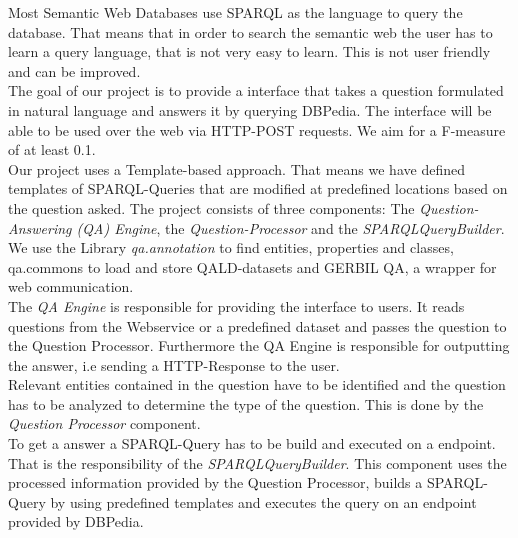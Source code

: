 \documentclass[runningheads]{llncs}
\begin{document}
Most Semantic Web Databases use SPARQL as the language to query the database. That means that in order to search the semantic web the user has to learn a query language, that is not very easy to learn. This is not user friendly and can be improved. \\

The goal of our project is to provide a interface that takes a question formulated in natural language and answers it by querying DBPedia. The interface will be able to be used over the web via HTTP-POST requests. We aim for a F-measure of at least 0.1. \\

Our project uses a Template-based approach. That means we have defined templates of SPARQL-Queries that are modified at predefined locations based on the question asked. The project consists of three components: The \emph{Question-Answering (QA) Engine}, the \emph{Question-Processor} and the \emph{SPARQLQueryBuilder}. We use the Library \emph{qa.annotation} to find entities, properties and classes, qa.commons to load and store QALD-datasets and GERBIL QA, a wrapper for web communication. \\

The \emph{QA Engine} is responsible for providing the interface to users. It reads questions from the Webservice or a predefined dataset and passes the question to the Question Processor. Furthermore the QA Engine is responsible for outputting the answer, i.e sending a HTTP-Response to the user. \\

Relevant entities contained in the question have to be identified and the question has to be analyzed to determine the type of the question. This is done by the \emph{Question Processor} component. \\

To get a answer a SPARQL-Query has to be build and executed on a endpoint. That is the responsibility of the \emph{SPARQLQueryBuilder}. This component uses the processed information provided by the Question Processor, builds a SPARQL-Query by using predefined templates and executes the query on an endpoint provided by DBPedia. \\ 

\pagebreak
\end{document}

